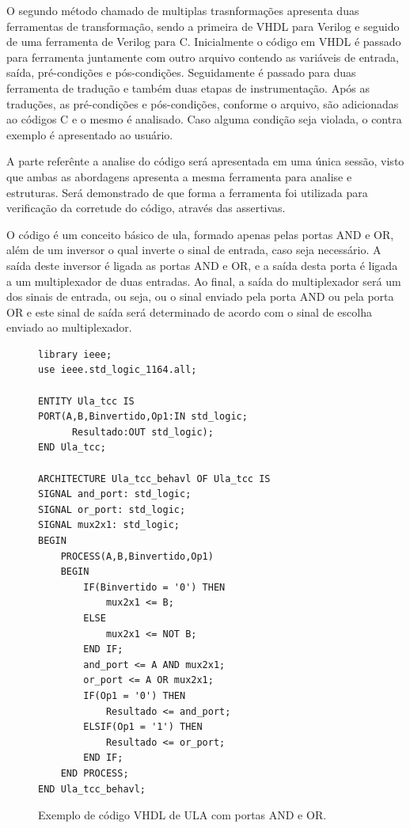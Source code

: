 \par
O segundo método chamado de multiplas trasnformações apresenta duas ferramentas de transformação, sendo a primeira de VHDL para Verilog e seguido de uma ferramenta de Verilog para C. Inicialmente o código em VHDL é passado para ferramenta juntamente com outro arquivo contendo as variáveis de entrada, saída, pré-condições e pós-condições. Seguidamente é passado para duas ferramenta de tradução e também duas etapas de instrumentação. Após as traduções, as pré-condições e pós-condições, conforme o arquivo, são adicionadas ao códigos C e o mesmo é analisado. Caso alguma condição seja violada, o contra exemplo é apresentado ao usuário.

\par
A parte referênte a analise do código será apresentada em uma única sessão, visto que ambas as abordagens apresenta a mesma ferramenta para analise e estruturas. Será demonstrado de que forma a ferramenta foi utilizada para verificação da corretude do código, através das assertivas. 

\par
O código é um conceito básico de ula, formado apenas pelas portas AND e OR, além de um inversor o qual inverte o sinal de entrada, caso seja necessário. A saída deste inversor é ligada as portas AND e OR, e a saída desta porta é ligada a um multiplexador de duas entradas. Ao final, a saída do multiplexador será um dos sinais de entrada, ou seja, ou o sinal enviado pela porta AND ou pela porta OR e este sinal de saída será determinado de acordo com o sinal de escolha enviado ao multiplexador.

\begin{figure}[H]
\caption{\label{fig:code_exemplo} Exemplo de código VHDL de ULA com portas AND e OR.}
	\begin{center}
    \begin{minipage}{0.7\textwidth}
    \begin{lstlisting}       
library ieee;
use ieee.std_logic_1164.all;

ENTITY Ula_tcc IS
PORT(A,B,Binvertido,Op1:IN std_logic;
	  Resultado:OUT std_logic);
END Ula_tcc;

ARCHITECTURE Ula_tcc_behavl OF Ula_tcc IS
SIGNAL and_port: std_logic;
SIGNAL or_port: std_logic;
SIGNAL mux2x1: std_logic;
BEGIN
	PROCESS(A,B,Binvertido,Op1)
	BEGIN
		IF(Binvertido = '0') THEN
			mux2x1 <= B;
		ELSE
			mux2x1 <= NOT B;
		END IF;
		and_port <= A AND mux2x1;
		or_port <= A OR mux2x1;
		IF(Op1 = '0') THEN
			Resultado <= and_port;
		ELSIF(Op1 = '1') THEN
			Resultado <= or_port;
		END IF;
	END PROCESS;
END Ula_tcc_behavl;
    \end{lstlisting}
    \end{minipage}
	\end{center}
\end{figure}

